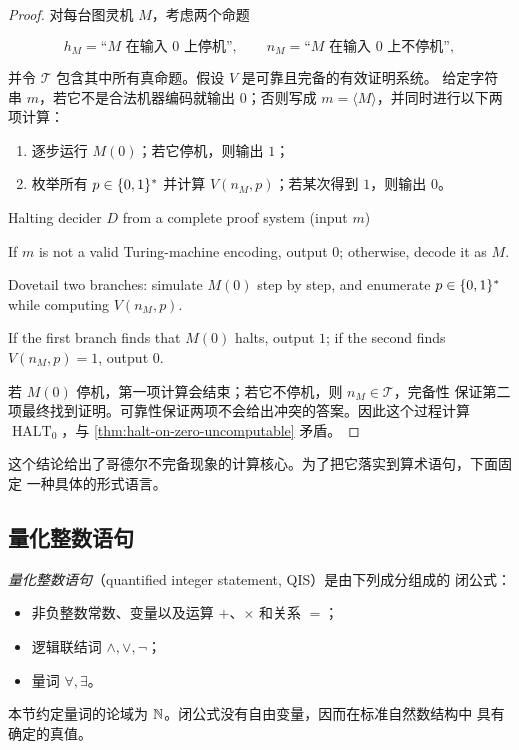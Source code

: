 \begin{proof}
  对每台图灵机 $M$，考虑两个命题

  \[
    h_M=\text{“$M$ 在输入 $0$ 上停机”},
    \qquad
    n_M=\text{“$M$ 在输入 $0$ 上不停机”},
  \]

  并令 $\mathcal T$ 包含其中所有真命题。假设 $V$ 是可靠且完备的有效证明系统。
  给定字符串 $m$，若它不是合法机器编码就输出 $0$；否则写成
  $m=\langle M\rangle$，并同时进行以下两项计算：

  \begin{enumerate}[label=\arabic*.]
    \item 逐步运行 $M(0)$；若它停机，则输出 $1$；
    \item 枚举所有 $p\in\{0,1\}^{*}$ 并计算 $V(n_M,p)$；若某次得到 $1$，则输出
      $0$。
  \end{enumerate}

  \begin{pseudocode}{Halting decider $D$ from a complete proof system
      (input $m$)}
    \item If $m$ is not a valid Turing-machine encoding, output $0$;
      otherwise, decode it as $M$.
    \item Dovetail two branches: simulate $M(0)$ step by step, and enumerate
      $p\in\{0,1\}^{*}$ while computing $V(n_M,p)$.
    \item If the first branch finds that $M(0)$ halts, output $1$; if the
      second finds $V(n_M,p)=1$, output $0$.
  \end{pseudocode}

  若 $M(0)$ 停机，第一项计算会结束；若它不停机，则 $n_M\in\mathcal T$，完备性
  保证第二项最终找到证明。可靠性保证两项不会给出冲突的答案。因此这个过程计算
  $\operatorname{HALT}_0$，与 \cref{thm:halt-on-zero-uncomputable} 矛盾。
\end{proof}

这个结论给出了哥德尔不完备现象的计算核心。为了把它落实到算术语句，下面固定
一种具体的形式语言。

\subsection{量化整数语句}

\begin{definition}[量化整数语句]
  \label{def:quantified-integer-statement}
  \emph{量化整数语句}（quantified integer statement, QIS）是由下列成分组成的
  闭公式：

  \begin{itemize}
    \item 非负整数常数、变量以及运算 $+$、$\times$ 和关系 $=$；
    \item 逻辑联结词 $\land,\lor,\lnot$；
    \item 量词 $\forall,\exists$。
  \end{itemize}

  本节约定量词的论域为 $\mathbb{N}$。闭公式没有自由变量，因而在标准自然数结构中
  具有确定的真值。
\end{definition}

